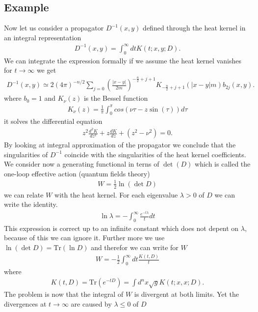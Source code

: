 \documentclass[a4paper]{article}
\theoremstyle{definition}
\theoremstyle{definition}
\theoremstyle{definition}
\theoremstyle{theorem}
\theoremstyle{theorem}
\theoremstyle{theorem}
\begin{document}
\subsection{Example}
Now let us consider a propagator $D^{-1}(x,y)$ defined through the heat kernel
in an integral representation
\begin{align}
    D^{-1} (x,y) = \int_0^\infty dt K(t;x,y;D).
\end{align}
We can integrate the expression formally if we assume the heat kernel vanishes
for $t\rightarrow \infty$ we get
\begin{align}
    D^{-1}(x,y) \simeq
    2(4\pi)^{-n/2}\sum_{j=0}\left(\frac{|x-y|}{2m}\right)^{-\frac{n}{2}+j+1}
    K_{-\frac{n}{2}+j+1}(|x-y|m)b_{2j}(x,y).
\end{align}
where $b_0 = 1$ and $K_\nu (z)$ is the Bessel function
\begin{align}
    K_\nu(z) = \frac{1}{\pi} \int_0^\pi cos(\nu\tau-z\sin(\tau))d\tau
\end{align}
it solves the differential equation
\begin{align}
    z^2 \frac{d^2K}{dz^2} + z \frac{dK}{dz} + (z^2 - \nu^2)=0.
\end{align}
By looking at integral approximation of the propagator we conclude
that the singularities of $D^{-1}$ coincide with the singularities of the heat
kernel coefficients.
We consider now a generating functional in terns of $\det(D)$ which is called
the one-loop effective action (quantum fields theory)
\begin{align}
    W = \frac{1}{2}\ln(\det D)
\end{align}
we can relate $W$ with the heat kernel. For each eigenvalue $\lambda >0$ of $D$
we can write the identity.
\begin{align}
    \ln \lambda  = -\int_0^\infty \frac{e^{-t\lambda}}{t}dt
\end{align}
This expression is correct up to an infinite constant which does not depent on
$\lambda$, because of this we can ignore it. Further more we use $\ln(\det D) =
\text{Tr}(\ln D)$ and therefor we can write for $W$
\begin{align}
    W = -\frac{1}{2} \int_0^\infty dt \frac{K(t, D)}{t}
\end{align}
where
\begin{align}
    K(t, D) = \text{Tr}(e^{-tD}) = \int d^n x \sqrt{g}K(t;x,x;D).
\end{align}
The problem is now that the integral of $W$ is divergent at both limits. Yet
the divergences at $t\rightarrow \infty$ are caused by $\lambda \leq 0$ of $D$
\end{document}
